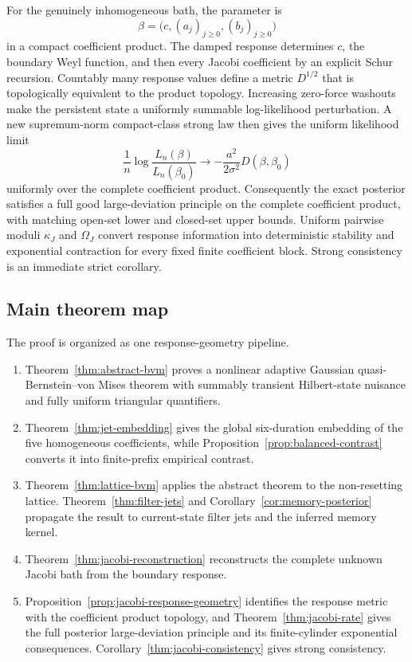 For the genuinely inhomogeneous bath, the parameter is
\[
 \beta=\bigl(c,(a_j)_{j\ge0},(b_j)_{j\ge0}\bigr)
\]
in a compact coefficient product.  The damped response determines \(c\),
the boundary Weyl function, and then every Jacobi coefficient by an explicit
Schur recursion.  Countably many response values define a metric \(D^{1/2}\)
that is topologically equivalent to the product topology.  Increasing
zero-force washouts make the persistent state a uniformly summable
log-likelihood perturbation.  A new supremum-norm compact-class strong law
then gives the uniform likelihood limit
\[
 \frac1n\log\frac{L_n(\beta)}{L_n(\beta_0)}
 \longrightarrow-\frac{a^2}{2\sigma^2}D(\beta,\beta_0)
\]
uniformly over the complete coefficient product.  Consequently the exact posterior satisfies a full good large-deviation
principle on the complete coefficient product, with matching open-set lower
and closed-set upper bounds.  Uniform pairwise moduli \(\kappa_J\) and
\(\Omega_J\) convert response information into deterministic stability and
exponential contraction for every fixed finite coefficient block.  Strong
consistency is an immediate strict corollary.

\subsection{Main theorem map}

The proof is organized as one response-geometry pipeline.
\begin{enumerate}
\item Theorem~\ref{thm:abstract-bvm} proves a nonlinear adaptive Gaussian
quasi-Bernstein--von Mises theorem with summably transient Hilbert-state
nuisance and fully uniform triangular quantifiers.
\item Theorem~\ref{thm:jet-embedding} gives the global six-duration embedding
of the five homogeneous coefficients, while
Proposition~\ref{prop:balanced-contrast} converts it into finite-prefix
empirical contrast.
\item Theorem~\ref{thm:lattice-bvm} applies the abstract theorem to the
non-resetting lattice.  Theorem~\ref{thm:filter-jets} and
Corollary~\ref{cor:memory-posterior} propagate the result to current-state
filter jets and the inferred memory kernel.
\item Theorem~\ref{thm:jacobi-reconstruction} reconstructs the complete
unknown Jacobi bath from the boundary response.
\item Proposition~\ref{prop:jacobi-response-geometry} identifies the response
metric with the coefficient product topology, and
Theorem~\ref{thm:jacobi-rate} gives the full posterior large-deviation
principle and its finite-cylinder exponential consequences.  Corollary~\ref{thm:jacobi-consistency} gives strong
consistency.
\end{enumerate}

